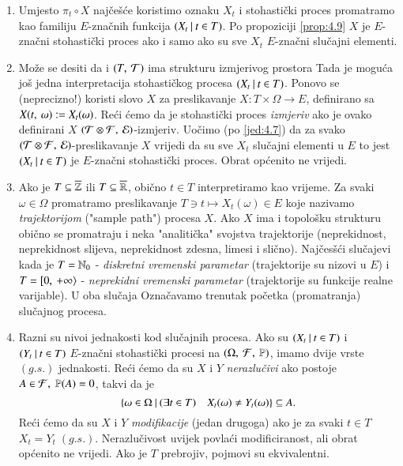 \begin{nap} \label{nap:8.2}
    \begin{enumerate}[label=(\alph*)]
        \item Umjesto $\pi_t \circ X$ naj\v ce\v s\' ce koristimo oznaku $X_t$ i stohasti\v cki proces promatramo kao familiju $E$-zna\v cnih funkcija $({X_t} \: | \: {t \in T})$.
        Po propoziciji \ref{prop:4.9} $X$ je $E$-zna\v cni stohasti\v cki proces ako i samo ako su sve $X_t$ $E$-zna\v cni slu\v cajni elementi.
        \item Mo\v ze se desiti da i $({T}, \: {\mathcal{T}})$ ima strukturu izmjerivog prostora
        Tada je mogu\' ca jo\v s jedna interpretacija stohasti\v ckog procesa $({X_t} \: | \: {t \in T})$.
        Ponovo se (neprecizno!) koristi slovo $X$ za preslikavanje $X : T \times \Omega \to E$, definirano sa $X ({t}, \: {\omega}) := X_t (\omega)$.
        Re\' ci \' cemo da je stohasti\v cki proces \emph{izmjeriv} ako je ovako definirani $X$ $({\mathcal{T} \otimes \mathcal{F}}, \: {\mathcal{E}})$-izmjeriv.
        Uo\v cimo (po \eqref{jed:4.7}) da za svako $({\mathcal{T} \otimes \mathcal{F}}, \: {\mathcal{E}})$-preslikavanje $X$ vrijedi da su sve $X_t$ slu\v cajni elementi u $E$ to jest $({X_t} \: | \: {t \in T})$ je $E$-zna\v cni stohasti\v cki proces.
        Obrat op\' cenito ne vrijedi.
        \item Ako je $T \subseteq \overline{\mathbb{Z}}$ ili $T \subseteq \overline{\mathbb{R}}$, obi\v cno $t \in T$ interpretiramo kao vrijeme.
        Za svaki $\omega \in \Omega$ promatramo preslikavanje $T \ni t \mapsto X_t (\omega) \in E$ koje nazivamo \emph{trajektorijom} ("sample path") procesa $X$.
        Ako $X$ ima i topolo\v sku strukturu obi\v cno se promatraju i neka "analiti\v cka" svojstva trajektorije (neprekidnost, neprekidnost slijeva, neprekidnost zdesna, limesi i sli\v cno).
        Naj\v ces\v s\' ci slu\v cajevi kada je $T = \mathbb{N}_0$ - \emph{diskretni vremenski parametar} (trajektorije su nizovi u $E$) i $T = [ {0}, \: {+\infty} \rangle$ - \emph{neprekidni vremenski parametar} (trajektorije su funkcije realne varijable).
        U oba slu\v caja Ozna\v cavamo trenutak po\v cetka  (promatranja) slu\v cajnog procesa.
        \item Razni su nivoi jednakosti kod slu\v cajnih procesa.
        Ako su $({X_t} \: | \: {t \in T})$ i $({Y_t} \: | \: {t \in T})$ $E$-zna\v cni stohasti\v cki procesi na $(\Omega, \: \mathcal{F}, \: \mathbb{P})$, imamo dvije vrste $(g.s.)$ jednakosti.
        Re\' ci \' cemo da su $X$ i $Y$ \emph{nerazlu\v civi} ako postoje $A \in \mathcal{F}, \; \mathbb{P}({A}) = 0$, takvi da je
        \begin{equation*}
            \{{\omega \in \Omega} \: | \: {(\exists t \in T) \quad X_t (\omega) \neq Y_t (\omega)}\} \subseteq A.
        \end{equation*}
        Re\' ci \' cemo da su $X$ i $Y$ \emph{modifikacije} (jedan drugoga) ako je za svaki $t \in T$ $X_t = Y_t \; (g.s.)$.
        Nerazlu\v civost uvijek povla\' ci modificiranost, ali obrat op\' cenito ne vrijedi.
        Ako je $T$ prebrojiv, pojmovi su ekvivalentni.
    \end{enumerate}
\end{nap}

